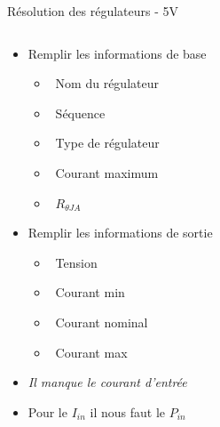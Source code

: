 \begin{frame}{Résolution des régulateurs - 5V}
    \begin{columns}
        \begin{column}{0.4\textwidth}
             {
                \begin{itemize}
                    \item Remplir les informations de base
                    \begin{itemize}
                        \item[] \textcolor{UDSgreenFierte}{\faFileSignature}
                            ~Nom du régulateur
                        \item[] \textcolor{UDSgreenFierte}{\faTasks}
                            ~Séquence
                        \item[] \textcolor{UDSgreenFierte}{\faWaveSquare}
                            ~Type de régulateur
                        \item[] \textcolor{UDSgreenFierte}{\faArrowRight}
                            ~Courant maximum
                        \item[] \textcolor{UDSgreenFierte}{\faTemperatureHigh}
                            ~$R_{\theta JA}$
                    \end{itemize}
                    \item Remplir les informations de sortie
                    \begin{itemize}
                        \item[] \textcolor{UDSgreenFierte}{\faBatteryThreeQuarters}
                            ~Tension
                        \item[] \textcolor{UDSgreenFierte}{\faBed}
                            ~Courant min
                        \item[] \textcolor{UDSgreenFierte}{\faWalking}
                            ~Courant nominal
                        \item[] \textcolor{UDSgreenFierte}{\faRunning}
                            ~Courant max
                    \end{itemize}
                    \item \textit{Il manque le courant d'entrée}
                \end{itemize}
            }
             {
                \begin{itemize}
                    \item Pour le $I_{in}$ il nous faut le $P_{in}$

\end{itemize}}
\end{column}
\end{columns}
\end{frame}
